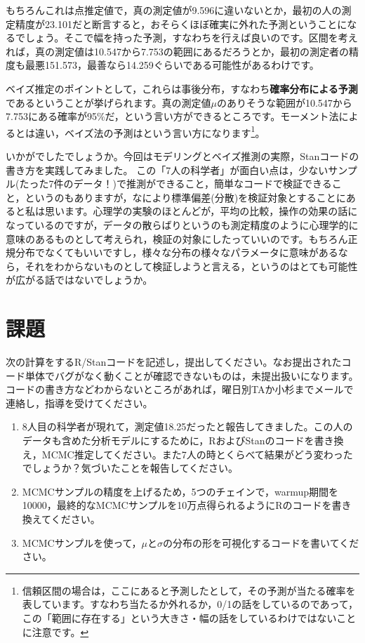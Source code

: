 \documentclass{ltjsbook}
\begin{document}
もちろんこれは点推定値で，真の測定値が9.596に違いないとか，最初の人の測定精度が23.101だと断言すると，おそらくほぼ確実に外れた予測ということになるでしょう。そこで幅を持った予測，すなわちを行えば良いのです。区間を考えれば，真の測定値は10.547から7.753の範囲にあるだろうとか，最初の測定者の精度も最悪151.573，最善なら14.259ぐらいである可能性があるわけです。

ベイズ推定のポイントとして，これらは事後分布，すなわち\textbf{確率分布による予測}であるということが挙げられます。真の測定値$\mu$のありそうな範囲が10.547から7.753にある確率が95\%だ，という言い方ができるところです。モーメント法によるとは違い，ベイズ法の予測はという言い方になります\footnote{信頼区間の場合は，ここにあると予測したとして，その予測が当たる確率を表しています。すなわち当たるか外れるか，0/1の話をしているのであって，この「範囲に存在する」という大きさ・幅の話をしているわけではないことに注意です。}。

いかがでしたでしょうか。今回はモデリングとベイズ推測の実際，Stanコードの書き方を実践してみました。
この「7人の科学者」が面白い点は，少ないサンプル(たった7件のデータ！)で推測ができること，簡単なコードで検証できること，というのもありますが，なにより標準偏差(分散)を検証対象とすることにあると私は思います。心理学の実験のほとんどが，平均の比較，操作の効果の話になっているのですが，データの散らばりというのも測定精度のように心理学的に意味のあるものとして考えられ，検証の対象にしたっていいのです。もちろん正規分布でなくてもいいですし，様々な分布の様々なパラメータに意味があるなら，それをわからないものとして検証しようと言える，というのはとても可能性が広がる話ではないでしょうか。
\section{課題}
次の計算をするR/Stanコードを記述し，提出してください。なお提出されたコード単体でバグがなく動くことが確認できないものは，未提出扱いになります。コードの書き方などわからないところがあれば，曜日別TAか小杉までメールで連絡し，指導を受けてください。
\begin{enumerate}
    \item 8人目の科学者が現れて，測定値18.25だったと報告してきました。この人のデータも含めた分析モデルにするために，RおよびStanのコードを書き換え，MCMC推定してください。また7人の時とくらべて結果がどう変わったでしょうか？気づいたことを報告してください。
    \item MCMCサンプルの精度を上げるため，5つのチェインで，warmup期間を10000，最終的なMCMCサンプルを10万点得られるようにRのコードを書き換えてください。
    \item MCMCサンプルを使って，$\mu$と$\sigma$の分布の形を可視化するコードを書いてください。
\end{enumerate}
\end{document}
